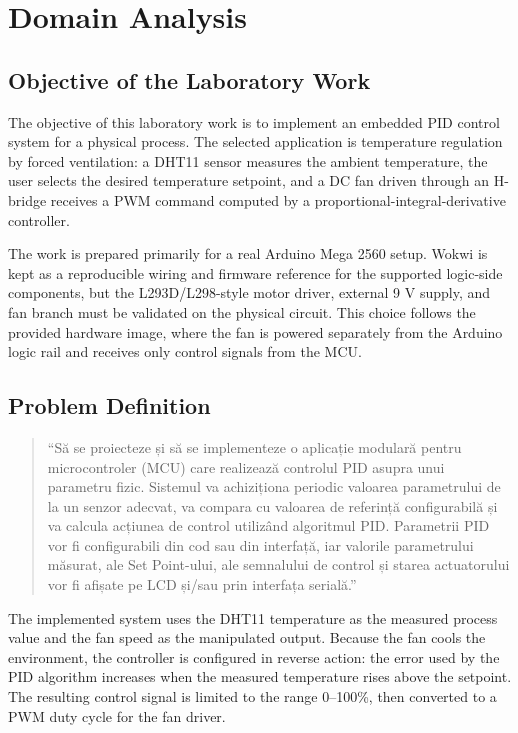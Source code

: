 \section{Domain Analysis}

\subsection{Objective of the Laboratory Work}

The objective of this laboratory work is to implement an embedded PID control system for a physical process. The selected application is temperature regulation by forced ventilation: a DHT11 sensor measures the ambient temperature, the user selects the desired temperature setpoint, and a DC fan driven through an H-bridge receives a PWM command computed by a proportional-integral-derivative controller.

The work is prepared primarily for a real Arduino Mega 2560 setup. Wokwi is kept as a reproducible wiring and firmware reference for the supported logic-side components, but the L293D/L298-style motor driver, external 9 V supply, and fan branch must be validated on the physical circuit. This choice follows the provided hardware image, where the fan is powered separately from the Arduino logic rail and receives only control signals from the MCU.

\subsection{Problem Definition}

\begin{quote}
\small
``Să se proiecteze și să se implementeze o aplicație modulară pentru microcontroler (MCU) care realizează controlul PID asupra unui parametru fizic. Sistemul va achiziționa periodic valoarea parametrului de la un senzor adecvat, va compara cu valoarea de referință configurabilă și va calcula acțiunea de control utilizând algoritmul PID. Parametrii PID vor fi configurabili din cod sau din interfață, iar valorile parametrului măsurat, ale Set Point-ului, ale semnalului de control și starea actuatorului vor fi afișate pe LCD și/sau prin interfața serială.''
\end{quote}

The implemented system uses the DHT11 temperature as the measured process value and the fan speed as the manipulated output. Because the fan cools the environment, the controller is configured in reverse action: the error used by the PID algorithm increases when the measured temperature rises above the setpoint. The resulting control signal is limited to the range 0--100\%, then converted to a PWM duty cycle for the fan driver.

